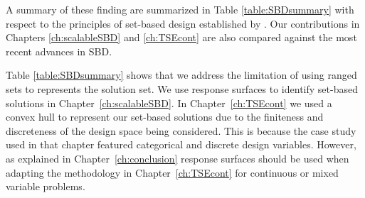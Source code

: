 A summary of these finding are summarized in Table \ref{table:SBDsummary} with respect to the principles of set-based design established by \citeauthor{SobekIi1999} \cite{SobekIi1999}. Our contributions in Chapters \ref{ch:scalableSBD} and \ref{ch:TSEcont} are also compared against the most recent advances in \ac{SBD}.

Table \ref{table:SBDsummary} shows that we address the limitation of using ranged sets to represents the solution set. We use response surfaces to identify set-based solutions in Chapter~\ref{ch:scalableSBD}. In Chapter~\ref{ch:TSEcont} we used a convex hull to represent our set-based solutions due to the finiteness and discreteness of the design space being considered. This is because the case study used in that chapter featured categorical and discrete design variables. However, as explained in Chapter~\ref{ch:conclusion} response surfaces should be used when adapting the methodology in Chapter~\ref{ch:TSEcont} for continuous or mixed variable problems.

\renewcommand{\changeCW}{0.55cm}
\renewcommand{\mycontCW}{1.2cm}

